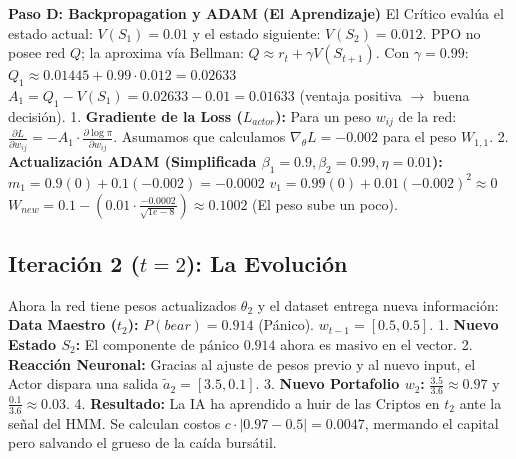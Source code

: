 \documentclass[11pt,a4paper]{article}
\begin{document}
\textbf{Paso D: Backpropagation y ADAM (El Aprendizaje)}
El Crítico evalúa el estado actual: $V(S_1) = 0.01$ y el estado siguiente: $V(S_2) = 0.012$.
PPO no posee red $Q$; la aproxima vía Bellman: $Q \approx r_t + \gamma V(S_{t+1})$.
Con $\gamma = 0.99$:
$Q_1 \approx 0.01445 + 0.99 \cdot 0.012 = 0.02633$
$A_1 = Q_1 - V(S_1) = 0.02633 - 0.01 = 0.01633$ (ventaja positiva $\rightarrow$ buena decisión).
1. \textbf{Gradiente de la Loss ($L_{actor}$):} Para un peso $w_{ij}$ de la red:
   $\frac{\partial L}{\partial w_{ij}} = -A_1 \cdot \frac{\partial \log \pi}{\partial w_{ij}}$. Asumamos que calculamos $\nabla_\theta L = -0.002$ para el peso $W_{1,1}$.
2. \textbf{Actualización ADAM (Simplificada $\beta_1=0.9, \beta_2=0.99, \eta=0.01$):}
   $m_1 = 0.9(0) + 0.1(-0.002) = -0.0002$
   $v_1 = 0.99(0) + 0.01(-0.002)^2 \approx 0$
   $W_{new} = 0.1 - (0.01 \cdot \frac{-0.0002}{\sqrt{1e-8}}) \approx 0.1002$ (El peso sube un poco).

\subsection{Iteración 2 ($t=2$): La Evolución}
Ahora la red tiene pesos actualizados $\theta_2$ y el dataset entrega nueva información:
\textbf{Data Maestro ($t_2$):} $P(bear)=0.914$ (Pánico). 
$w_{t-1} = [0.5, 0.5]$.
1. \textbf{Nuevo Estado $S_2$:} El componente de pánico $0.914$ ahora es masivo en el vector.
2. \textbf{Reacción Neuronal:} Gracias al ajuste de pesos previo y al nuevo input, el Actor dispara una salida $\tilde{a}_2 = [3.5, 0.1]$.
3. \textbf{Nuevo Portafolio $w_2$:} $\frac{3.5}{3.6} \approx 0.97$ y $\frac{0.1}{3.6} \approx 0.03$.
4. \textbf{Resultado:} La IA ha aprendido a huir de las Criptos en $t_2$ ante la señal del HMM. Se calculan costos $c \cdot |0.97 - 0.5| = 0.0047$, mermando el capital pero salvando el grueso de la caída bursátil.
\end{document}
